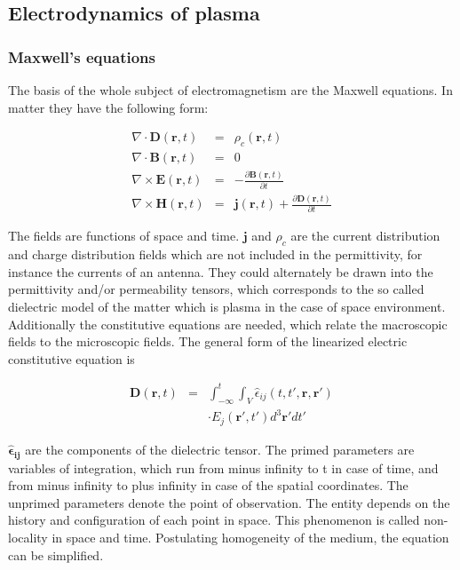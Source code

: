 \documentclass[two-column,ras]{agutex}
\begin{document}
\begin{article}
\subsection{Electrodynamics of plasma}
\subsubsection{Maxwell's equations}
The basis of the whole subject of electromagnetism are the Maxwell
equations. In matter they have the following form:

\begin{eqnarray}
\nabla \cdot \mathbf{D}(\mathbf{r},t)&=&\rho_c(\mathbf{r},t) \label{maxwell1}\\
\nabla \cdot \mathbf{B}(\mathbf{r},t)&=&0 \label{maxwell2} \\
\nabla \times \mathbf{E}(\mathbf{r},t)&=&-\frac{\partial \mathbf{B}(\mathbf{r},t)}{\partial t} \label{maxwell3} \\
\nabla \times \mathbf{H}(\mathbf{r},t)&=&\mathbf{j}(\mathbf{r},t)+ \frac{\partial \mathbf{D}(\mathbf{r},t)}{\partial t} \label{maxwell4}
\end{eqnarray}

The fields are functions of space and time. $\mathbf{j}$ and
$\rho_c$ are the current distribution and charge distribution fields
which are not included in the permittivity, for instance the currents of an antenna. They could alternately be drawn into the permittivity and/or permeability tensors, which corresponds to the so called dielectric model of the matter which is plasma in the case of space environment.
Additionally the constitutive equations are needed, which relate the
macroscopic fields to the microscopic fields. The general form of the linearized electric constitutive equation is

\begin{eqnarray}
    \mathbf{D}(\mathbf{r},t)&=&\int_{-\infty}^t\int_V\hat{\epsilon}_{ij}(t,t',\mathbf{r},\mathbf{r'}) \\
&&\cdot E_j(\mathbf{r'},t')d^3\mathbf{r'}dt'\nonumber
\end{eqnarray}

$\mathbf{\hat{\epsilon}_{ij}}$ are the components of the dielectric tensor. The primed parameters are  variables of integration, which run from minus infinity to t in case of time, and from minus infinity to plus infinity in case of the spatial coordinates. The unprimed parameters denote the point of observation. The entity depends on the history and configuration of each point in space. This phenomenon is called non-locality in space and time. Postulating homogeneity of the medium, the equation can be simplified.


\end{article}
\end{document}
